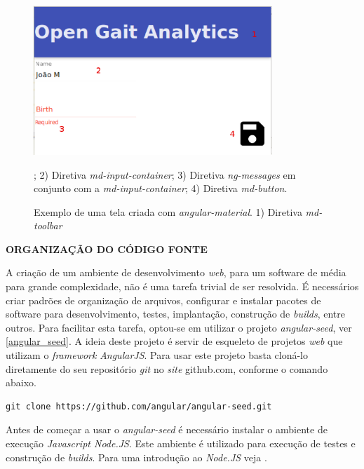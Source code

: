 \begin{figure}[ht]
	\centering
	\includegraphics[width=9cm]{figuras/material_amostra.eps}
	\caption[Exemplo de uma tela criada com \emph{angular-material}.]{Exemplo de uma tela criada com \emph{angular-material}. 1) Diretiva \emph{md-toolbar}}; 2) Diretiva \emph{md-input-container}; 3) Diretiva \emph{ng-messages} em conjunto com a \emph{md-input-container}; 4) Diretiva \emph{md-button}.
	\label{material_amostra}
\end{figure}

\textbf{ORGANIZAÇÃO DO CÓDIGO FONTE}

A criação de um ambiente de desenvolvimento \emph{web}, para um software de média para grande complexidade, não é uma tarefa trivial de ser resolvida.
É necessários criar padrões de organização de arquivos, configurar e instalar pacotes de software para desenvolvimento, testes, implantação, construção de \emph{builds}, entre outros.
Para facilitar esta tarefa, optou-se em utilizar o projeto \emph{angular-seed}, ver \ref{angular_seed}.
A ideia deste projeto é servir de esqueleto de projetos \emph{web} que utilizam o \emph{framework} \emph{AngularJS}.
Para usar este projeto basta cloná-lo diretamente do seu repositório \emph{git} no \emph{site} github.com, conforme o comando abaixo.
\lstset{language=bash}
\begin{lstlisting}[frame=single]
git clone https://github.com/angular/angular-seed.git
\end{lstlisting}

Antes de começar a usar o \emph{angular-seed} é necessário instalar o ambiente de execução \emph{Javascript Node.JS}. 
Este ambiente é utilizado para execução de testes e construção de \emph{builds}. Para uma introdução ao \emph{Node.JS} veja \cite{Syed2014}.
